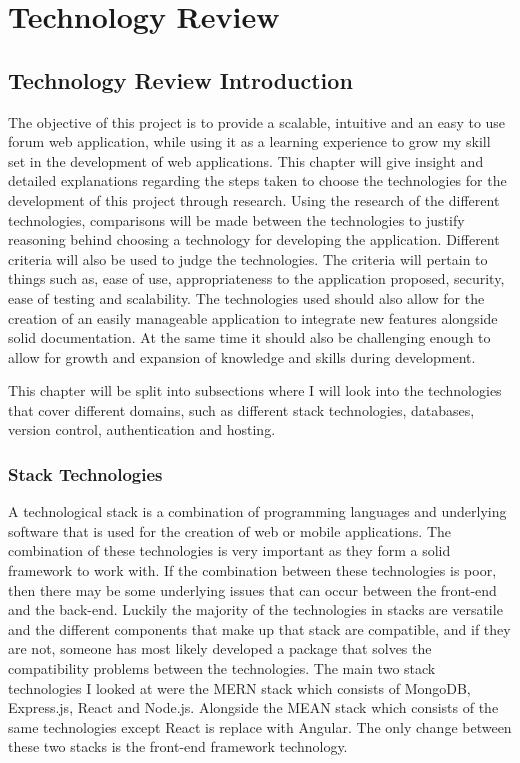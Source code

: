 \chapter{Technology Review}
\section{Technology Review Introduction}
The objective of this project is to provide a scalable, intuitive and an easy to use forum web application, while using it as a learning experience to grow my skill set in the development of web applications. This chapter will give insight and detailed explanations regarding the steps taken to choose the technologies for the development of this project through research. Using the research of the different technologies, comparisons will be made between the technologies to justify reasoning behind choosing a technology for developing the application. Different criteria will also be used to judge the technologies. The criteria will pertain to things such as, ease of use, appropriateness to the application proposed, security, ease of testing and scalability. The technologies used should also allow for the creation of an easily manageable application to integrate new features alongside solid documentation. At the same time it should also be challenging enough to allow for growth and expansion of knowledge and skills during development.

This chapter will be split into subsections where I will look into the technologies that cover different domains, such as different stack technologies, databases, version control, authentication and hosting.

\subsection{Stack Technologies}
A technological stack is a combination of programming languages and underlying software that is used for the creation of web or mobile applications. The combination of these technologies is very important as they form a solid framework to work with. If the combination between these technologies is poor, then there may be some underlying issues that can occur between the front-end and the back-end. Luckily the majority of the technologies in stacks are versatile and the different components that make up that stack are compatible, and if they are not, someone has most likely developed a package that solves the compatibility problems between the technologies. The main two stack technologies I looked at were the MERN stack which consists of MongoDB, Express.js, React and Node.js. Alongside the MEAN stack which consists of the same technologies except React is replace with Angular. The only change between these two stacks is the front-end framework technology.

